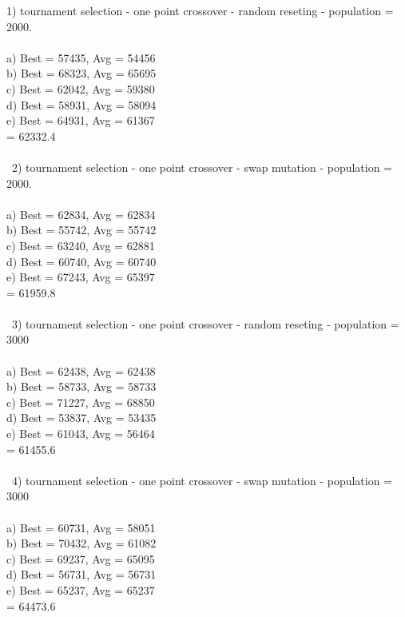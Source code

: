 \documentclass[12pt]{article}
\newcommand\tab[1][1cm]{\hspace*{#1}}
\begin{document}
1) tournament selection - one point crossover - random reseting - population = 2000.\\\\
\tab a) Best = 57435, Avg = 54456\\
\tab b) Best = 68323, Avg = 65695\\
\tab c) Best = 62042, Avg = 59380\\
\tab d) Best = 58931, Avg = 58094\\
\tab e) Best = 64931, Avg = 61367\\
\tab {} = 62332.4\\\\\
2) tournament selection - one point crossover - swap mutation - population = 2000.\\\\
\tab a) Best = 62834, Avg = 62834\\
\tab b) Best = 55742, Avg = 55742\\
\tab c) Best = 63240, Avg = 62881\\
\tab d) Best = 60740, Avg = 60740\\
\tab e) Best = 67243, Avg = 65397\\
\tab {} = 61959.8\\\\\
3) tournament selection - one point crossover - random reseting - population = 3000\\\\
\tab a) Best = 62438, Avg = 62438\\
\tab b) Best = 58733, Avg = 58733\\
\tab c) Best = 71227, Avg = 68850\\
\tab d) Best = 53837, Avg = 53435\\
\tab e) Best = 61043, Avg = 56464\\
\tab \boldsymbol{AvgBest:} = 61455.6\\\\\
4) tournament selection - one point crossover - swap mutation - population = 3000\\\\
\tab a) Best = 60731, Avg = 58051\\
\tab b) Best = 70432, Avg = 61082\\
\tab c) Best = 69237, Avg = 65095\\
\tab d) Best = 56731, Avg = 56731\\
\tab e) Best = 65237, Avg = 65237\\
\tab \boldsymbol{AvgBest:} = 64473.6\\\\\
\end{document}
